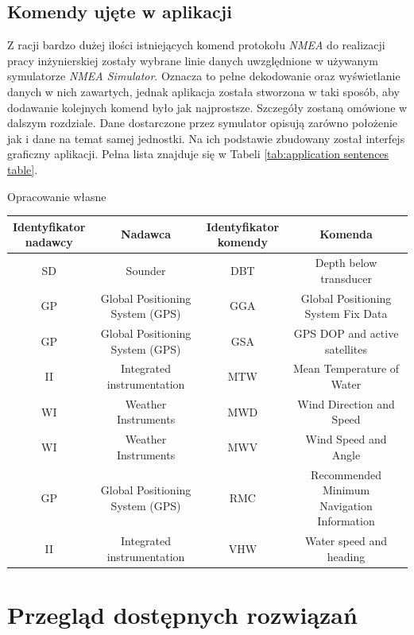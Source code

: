 \documentclass[skorowidz,skroty]{dyplomWEZUT}
\begin{document}
\section{Komendy ujęte w aplikacji}\label{sec:application sentences}
Z racji bardzo dużej ilości istniejących komend protokołu \textit{NMEA} do realizacji pracy inżynierskiej zostały wybrane linie danych uwzględnione w używanym symulatorze \textit{NMEA Simulator}. Oznacza to pełne dekodowanie oraz wyświetlanie danych w nich zawartych, jednak aplikacja została stworzona w taki sposób, aby dodawanie kolejnych komend było jak najprostsze. Szczegóły zostaną omówione w dalszym rozdziale. Dane dostarczone przez symulator opisują zarówno położenie jak i dane na temat samej jednostki. Na ich podstawie zbudowany został interfejs graficzny aplikacji. Pełna lista znajduje się w Tabeli \ref{tab:application sentences table}.

{Opracowanie własne}
{\begin{tabular}{c|c|c|c}
\thead{Identyfikator \\ nadawcy} & Nadawca & \thead{Identyfikator \\ komendy} & Komenda \\\hline\hline
SD & Sounder & DBT & Depth below transducer\\
\hline
GP & \makecell{Global Positioning \\ System (GPS)} & GGA & Global Positioning System Fix Data\\
\hline
GP & \makecell{Global Positioning \\ System (GPS)} & GSA & GPS DOP and active satellites\\
\hline
II & Integrated instrumentation & MTW & Mean Temperature of Water\\
\hline
WI & Weather Instruments & MWD & Wind Direction and Speed\\
\hline
WI & Weather Instruments & MWV &  Wind Speed and Angle\\
\hline
GP &\makecell{Global Positioning \\ System (GPS)} & RMC & \makecell{Recommended Minimum \\ Navigation Information}\\
\hline
II & Integrated instrumentation & VHW & Water speed and heading
\end{tabular}}

\chapter{Przegląd dostępnych rozwiązań}\label{chap: Available solutions}
\end{document}
